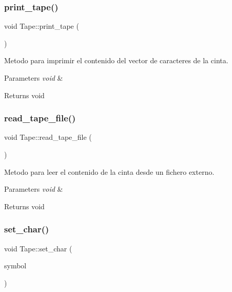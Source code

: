 \subsubsection{\texorpdfstring{print\+\_\+tape()}{print\_tape()}}
{\footnotesize\ttfamily void Tape\+::print\+\_\+tape (\begin{DoxyParamCaption}\item[{void}]{ }\end{DoxyParamCaption})}



Metodo para imprimir el contenido del vector de caracteres de la cinta. 


\begin{DoxyParams}{Parameters}
{\em void} & \\
\hline
\end{DoxyParams}
\begin{DoxyReturn}{Returns}
void 
\end{DoxyReturn}
\hypertarget{class_tape_ab41614cfbca9b6f6544215f0cd467f6c}{}\label{class_tape_ab41614cfbca9b6f6544215f0cd467f6c} 
\subsubsection{\texorpdfstring{read\+\_\+tape\+\_\+file()}{read\_tape\_file()}}
{\footnotesize\ttfamily void Tape\+::read\+\_\+tape\+\_\+file (\begin{DoxyParamCaption}\item[{void}]{ }\end{DoxyParamCaption})}



Metodo para leer el contenido de la cinta desde un fichero externo. 


\begin{DoxyParams}{Parameters}
{\em void} & \\
\hline
\end{DoxyParams}
\begin{DoxyReturn}{Returns}
void 
\end{DoxyReturn}
\hypertarget{class_tape_afd396547441cee62e2ea7d55650f8275}{}\label{class_tape_afd396547441cee62e2ea7d55650f8275} 
\subsubsection{\texorpdfstring{set\+\_\+char()}{set\_char()}}
{\footnotesize\ttfamily void Tape\+::set\+\_\+char (\begin{DoxyParamCaption}\item[{char}]{symbol }\end{DoxyParamCaption})}



